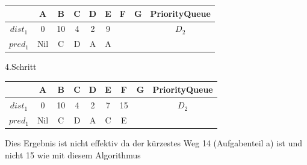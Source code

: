 \documentclass[11pt]{article}
\begin{document}
\begin{enumerate}[a)]
\begin{tabular}{|c|c|c|c|c|c|c|c|c|}
	\hline  		  & A & B & C & D & E & F & G & PriorityQueue\\ 
	\hline $dist_{1}$ & 0 & 10  & 4 & 2 & 9 &  &  & $D_{2}$\\ 
	\hline $pred_{1}$ & Nil & C & D & A & A &  &  &\\
	\hline 
\end{tabular}  

4.Schritt

\begin{tabular}{|c|c|c|c|c|c|c|c|c|}
	\hline  		  & A & B & C & D & E & F & G & PriorityQueue\\ 
	\hline $dist_{1}$ & 0 & 10  & 4 & 2 & 7 & 15 &  & $D_{2}$\\ 
	\hline $pred_{1}$ & Nil & C & D & A & C & E &  &\\
	\hline 
\end{tabular}

Dies Ergebnis ist nicht effektiv da der kürzestes Weg 14 (Aufgabenteil a) ist und nicht 15 wie mit diesem Algorithmus


\end{enumerate}
\end{document}

